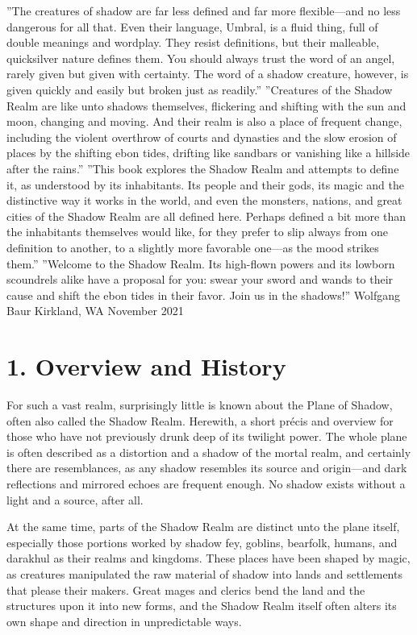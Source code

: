 \documentclass[10pt,a4paper,twoside,bg=print,twocolumn,openany,nodeprecatedcode]{dndbook}
\begin{document}
\DndQuote%
{}
{''The creatures of shadow are far less defined and far more flexible—and no less dangerous for all that. Even their language, Umbral, is a fluid thing, full of double meanings and wordplay. They resist definitions, but their malleable, quicksilver nature defines them. You should always trust the word of an angel, rarely given but given with certainty. The word of a shadow creature, however, is given quickly and easily but broken just as readily.''}
{''Creatures of the Shadow Realm are like unto shadows themselves, flickering and shifting with the sun and moon, changing and moving. And their realm is also a place of frequent change, including the violent overthrow of courts and dynasties and the slow erosion of places by the shifting ebon tides, drifting like sandbars or vanishing like a hillside after the rains.''}
{''This book explores the Shadow Realm and attempts to define it, as understood by its inhabitants. Its people and their gods, its magic and the distinctive way it works in the world, and even the monsters, nations, and great cities of the Shadow Realm are all defined here. Perhaps defined a bit more than the inhabitants themselves would like, for they prefer to slip always from one definition to another, to a slightly more favorable one—as the mood strikes them.''}
{''Welcome to the Shadow Realm. Its high-flown powers and its lowborn scoundrels alike have a proposal for you: swear your sword and wands to their cause and shift the ebon tides in their favor. Join us in the shadows!''}
{Wolfgang Baur Kirkland, WA November 2021}
\chapter{1. Overview and History}
For such a vast realm, surprisingly little is known about the Plane of Shadow, often also called the Shadow Realm. Herewith, a short précis and overview for those who have not previously drunk deep of its twilight power. The whole plane is often described as a distortion and a shadow of the mortal realm, and certainly there are resemblances, as any shadow resembles its source and origin—and dark reflections and mirrored echoes are frequent enough. No shadow exists without a light and a source, after all.

At the same time, parts of the Shadow Realm are distinct unto the plane itself, especially those portions worked by shadow fey, goblins, bearfolk, humans, and darakhul as their realms and kingdoms. These places have been shaped by magic, as creatures manipulated the raw material of shadow into lands and settlements that please their makers. Great mages and clerics bend the land and the structures upon it into new forms, and the Shadow Realm itself often alters its own shape and direction in unpredictable ways.
\end{document}

